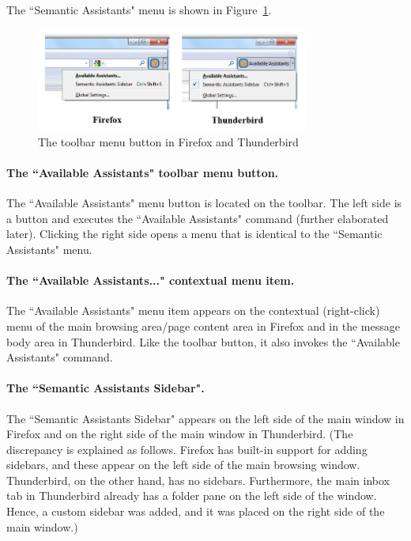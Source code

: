 The ``Semantic Assistants" menu is shown in Figure~\ref{fig:mozilla_features_toolbar_menu_button}. 

\begin{figure}[htb]
  \centering
  \includegraphics[width=0.8\textwidth]{pictures/mozilla_features_toolbar_menu_button.png}
  \caption{The toolbar menu button in Firefox and Thunderbird}
  \label{fig:mozilla_features_toolbar_menu_button}
\end{figure}

\paragraph{The ``Available Assistants" toolbar menu button.} The ``Available Assistants" menu button is located on the toolbar. The left side is a button and executes the ``Available Assistants" command (further elaborated later). Clicking the right side opens a menu that is identical to the ``Semantic Assistants" menu. 

\paragraph{The ``Available Assistants..." contextual menu item.} The ``Available Assistants" menu item appears on the contextual (right-click) menu of the main browsing area/page content area in Firefox and in the message body area in Thunderbird. Like the toolbar button, it also invokes the ``Available Assistants" command. 

\paragraph{The ``Semantic Assistants Sidebar".} The ``Semantic Assistants Sidebar" appears on the left side of the main window in Firefox and on the right side of the main window in Thunderbird. (The discrepancy is explained as follows. Firefox has built-in support for adding sidebars, and these appear on the left side of the main browsing window. Thunderbird, on the other hand, has no sidebars. Furthermore, the main inbox tab in Thunderbird already has a folder pane on the left side of the window. Hence, a custom sidebar was added, and it was placed on the right side of the main window.) 

